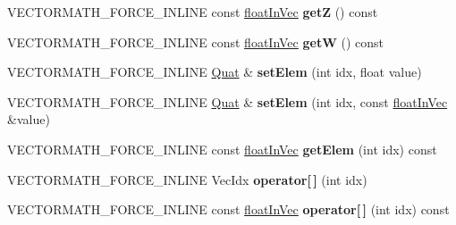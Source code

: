 \begin{DoxyCompactItemize}
\item 
\mbox{\label{classVectormath_1_1Aos_1_1Quat_a052078ed001599dc3edd55abc67f00f2}} 
V\+E\+C\+T\+O\+R\+M\+A\+T\+H\+\_\+\+F\+O\+R\+C\+E\+\_\+\+I\+N\+L\+I\+NE const \hyperlink{classVectormath_1_1floatInVec}{float\+In\+Vec} {\bfseries getZ} () const
\item 
\mbox{\label{classVectormath_1_1Aos_1_1Quat_a34193ea31d58f9e0c0dc48f7ad10f572}} 
V\+E\+C\+T\+O\+R\+M\+A\+T\+H\+\_\+\+F\+O\+R\+C\+E\+\_\+\+I\+N\+L\+I\+NE const \hyperlink{classVectormath_1_1floatInVec}{float\+In\+Vec} {\bfseries getW} () const
\item 
\mbox{\label{classVectormath_1_1Aos_1_1Quat_afd13fc9c366143b07fb28215bcf0ee64}} 
V\+E\+C\+T\+O\+R\+M\+A\+T\+H\+\_\+\+F\+O\+R\+C\+E\+\_\+\+I\+N\+L\+I\+NE \hyperlink{classVectormath_1_1Aos_1_1Quat}{Quat} \& {\bfseries set\+Elem} (int idx, float value)
\item 
\mbox{\label{classVectormath_1_1Aos_1_1Quat_ae1944f695987bc1e79bf67d5c80f60c3}} 
V\+E\+C\+T\+O\+R\+M\+A\+T\+H\+\_\+\+F\+O\+R\+C\+E\+\_\+\+I\+N\+L\+I\+NE \hyperlink{classVectormath_1_1Aos_1_1Quat}{Quat} \& {\bfseries set\+Elem} (int idx, const \hyperlink{classVectormath_1_1floatInVec}{float\+In\+Vec} \&value)
\item 
\mbox{\label{classVectormath_1_1Aos_1_1Quat_aef3508f2049f0af59ea540184b5bda25}} 
V\+E\+C\+T\+O\+R\+M\+A\+T\+H\+\_\+\+F\+O\+R\+C\+E\+\_\+\+I\+N\+L\+I\+NE const \hyperlink{classVectormath_1_1floatInVec}{float\+In\+Vec} {\bfseries get\+Elem} (int idx) const
\item 
\mbox{\label{classVectormath_1_1Aos_1_1Quat_a5db86568489c304ce41351d8f4f4533c}} 
V\+E\+C\+T\+O\+R\+M\+A\+T\+H\+\_\+\+F\+O\+R\+C\+E\+\_\+\+I\+N\+L\+I\+NE Vec\+Idx {\bfseries operator\mbox{[}$\,$\mbox{]}} (int idx)
\item 
\mbox{\label{classVectormath_1_1Aos_1_1Quat_a9fdc8b65a955e30c9aa995529233d69e}} 
V\+E\+C\+T\+O\+R\+M\+A\+T\+H\+\_\+\+F\+O\+R\+C\+E\+\_\+\+I\+N\+L\+I\+NE const \hyperlink{classVectormath_1_1floatInVec}{float\+In\+Vec} {\bfseries operator\mbox{[}$\,$\mbox{]}} (int idx) const

\end{DoxyCompactItemize}
